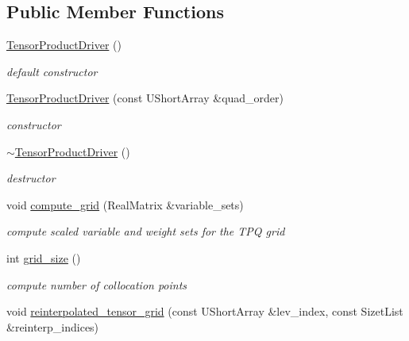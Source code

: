 \subsection*{Public Member Functions}
\begin{DoxyCompactItemize}
\item 
\hyperlink{classPecos_1_1TensorProductDriver_ae6ac11a1b6270b43d55f1c86b918cab7}{Tensor\+Product\+Driver} ()\label{classPecos_1_1TensorProductDriver_ae6ac11a1b6270b43d55f1c86b918cab7}

\begin{DoxyCompactList}\small\item\em default constructor \end{DoxyCompactList}\item 
\hyperlink{classPecos_1_1TensorProductDriver_ad297afa8d910c00ebf0f6a6e04e8d4fa}{Tensor\+Product\+Driver} (const U\+Short\+Array \&quad\+\_\+order)\label{classPecos_1_1TensorProductDriver_ad297afa8d910c00ebf0f6a6e04e8d4fa}

\begin{DoxyCompactList}\small\item\em constructor \end{DoxyCompactList}\item 
\hyperlink{classPecos_1_1TensorProductDriver_aa3a204b0a27ed4a3f0121bd937bf3bed}{$\sim$\+Tensor\+Product\+Driver} ()\label{classPecos_1_1TensorProductDriver_aa3a204b0a27ed4a3f0121bd937bf3bed}

\begin{DoxyCompactList}\small\item\em destructor \end{DoxyCompactList}\item 
void \hyperlink{classPecos_1_1TensorProductDriver_a66d564a1e3e1b33220a43d2e2629aace}{compute\+\_\+grid} (Real\+Matrix \&variable\+\_\+sets)\label{classPecos_1_1TensorProductDriver_a66d564a1e3e1b33220a43d2e2629aace}

\begin{DoxyCompactList}\small\item\em compute scaled variable and weight sets for the T\+PQ grid \end{DoxyCompactList}\item 
int \hyperlink{classPecos_1_1TensorProductDriver_a4b04c73f01f5eb9e6171305141eb1f73}{grid\+\_\+size} ()\label{classPecos_1_1TensorProductDriver_a4b04c73f01f5eb9e6171305141eb1f73}

\begin{DoxyCompactList}\small\item\em compute number of collocation points \end{DoxyCompactList}\item 
void \hyperlink{classPecos_1_1TensorProductDriver_a875c01d83eb38586e43712a94e713312}{reinterpolated\+\_\+tensor\+\_\+grid} (const U\+Short\+Array \&lev\+\_\+index, const Sizet\+List \&reinterp\+\_\+indices)\label{classPecos_1_1TensorProductDriver_a875c01d83eb38586e43712a94e713312}


\end{DoxyCompactItemize}
